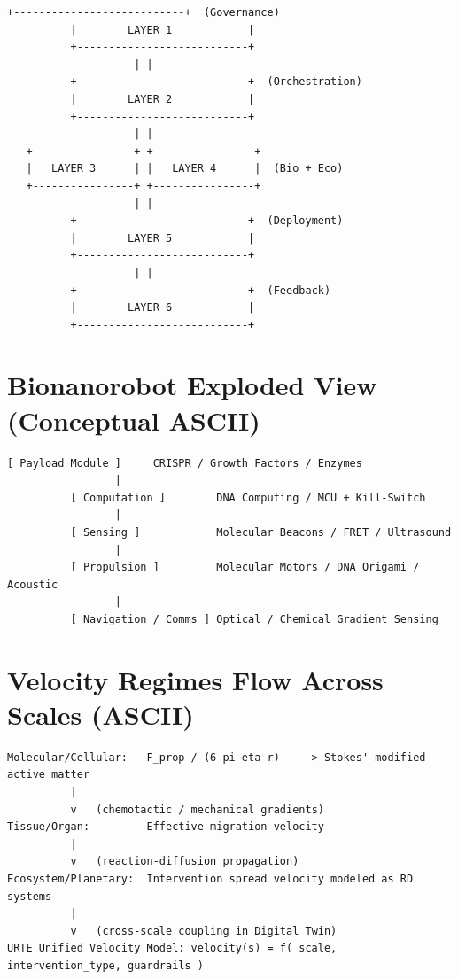 \documentclass[11pt,a4paper]{report}
\begin{document}
\begin{lstlisting}[style=asciistyle]
          +---------------------------+  (Governance)
          |        LAYER 1            |
          +---------------------------+
                    | |
          +---------------------------+  (Orchestration)
          |        LAYER 2            |
          +---------------------------+
                    | |
   +----------------+ +----------------+
   |   LAYER 3      | |   LAYER 4      |  (Bio + Eco)
   +----------------+ +----------------+
                    | |
          +---------------------------+  (Deployment)
          |        LAYER 5            |
          +---------------------------+
                    | |
          +---------------------------+  (Feedback)
          |        LAYER 6            |
          +---------------------------+
\end{lstlisting}

\section{Bionanorobot Exploded View (Conceptual ASCII)}

\begin{lstlisting}[style=asciistyle]
          [ Payload Module ]     CRISPR / Growth Factors / Enzymes
                 |
          [ Computation ]        DNA Computing / MCU + Kill-Switch
                 |
          [ Sensing ]            Molecular Beacons / FRET / Ultrasound
                 |
          [ Propulsion ]         Molecular Motors / DNA Origami / Acoustic
                 |
          [ Navigation / Comms ] Optical / Chemical Gradient Sensing
\end{lstlisting}

\section{Velocity Regimes Flow Across Scales (ASCII)}

\begin{lstlisting}[style=asciistyle]
Molecular/Cellular:   F_prop / (6 pi eta r)   --> Stokes' modified active matter
          |
          v   (chemotactic / mechanical gradients)
Tissue/Organ:         Effective migration velocity
          |
          v   (reaction-diffusion propagation)
Ecosystem/Planetary:  Intervention spread velocity modeled as RD systems
          |
          v   (cross-scale coupling in Digital Twin)
URTE Unified Velocity Model: velocity(s) = f( scale, intervention_type, guardrails )
\end{lstlisting}
\end{document}
